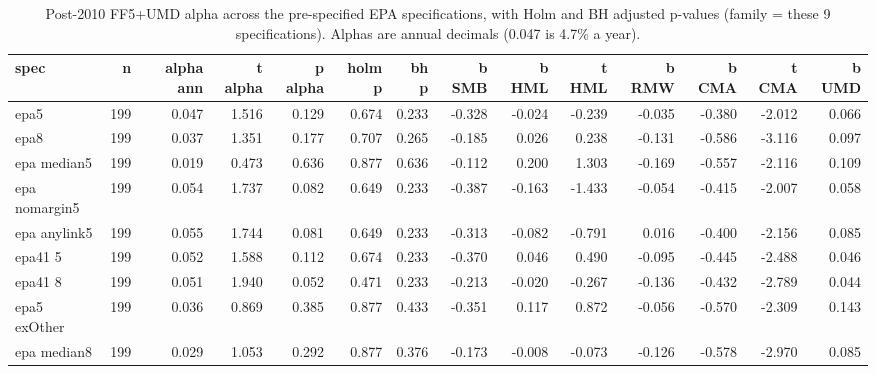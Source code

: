 \begin{table}[H]
\centering\small
\caption{Post-2010 FF5+UMD alpha across the pre-specified EPA specifications, with Holm and BH adjusted p-values (family = these 9 specifications). Alphas are annual decimals (0.047 is 4.7\% a year).}
\label{tab:m4_family}
\begin{adjustbox}{max width=\linewidth}
\begin{tabular}{lrrrrrrrrrrrrr}
\toprule
spec & n & alpha ann & t alpha & p alpha & holm p & bh p & b SMB & b HML & t HML & b RMW & b CMA & t CMA & b UMD \\
\midrule
epa5 & 199 & 0.047 & 1.516 & 0.129 & 0.674 & 0.233 & -0.328 & -0.024 & -0.239 & -0.035 & -0.380 & -2.012 & 0.066 \\
epa8 & 199 & 0.037 & 1.351 & 0.177 & 0.707 & 0.265 & -0.185 & 0.026 & 0.238 & -0.131 & -0.586 & -3.116 & 0.097 \\
epa median5 & 199 & 0.019 & 0.473 & 0.636 & 0.877 & 0.636 & -0.112 & 0.200 & 1.303 & -0.169 & -0.557 & -2.116 & 0.109 \\
epa nomargin5 & 199 & 0.054 & 1.737 & 0.082 & 0.649 & 0.233 & -0.387 & -0.163 & -1.433 & -0.054 & -0.415 & -2.007 & 0.058 \\
epa anylink5 & 199 & 0.055 & 1.744 & 0.081 & 0.649 & 0.233 & -0.313 & -0.082 & -0.791 & 0.016 & -0.400 & -2.156 & 0.085 \\
epa41 5 & 199 & 0.052 & 1.588 & 0.112 & 0.674 & 0.233 & -0.370 & 0.046 & 0.490 & -0.095 & -0.445 & -2.488 & 0.046 \\
epa41 8 & 199 & 0.051 & 1.940 & 0.052 & 0.471 & 0.233 & -0.213 & -0.020 & -0.267 & -0.136 & -0.432 & -2.789 & 0.044 \\
epa5 exOther & 199 & 0.036 & 0.869 & 0.385 & 0.877 & 0.433 & -0.351 & 0.117 & 0.872 & -0.056 & -0.570 & -2.309 & 0.143 \\
epa median8 & 199 & 0.029 & 1.053 & 0.292 & 0.877 & 0.376 & -0.173 & -0.008 & -0.073 & -0.126 & -0.578 & -2.970 & 0.085 \\
\bottomrule
\end{tabular}
\end{adjustbox}
\end{table}
